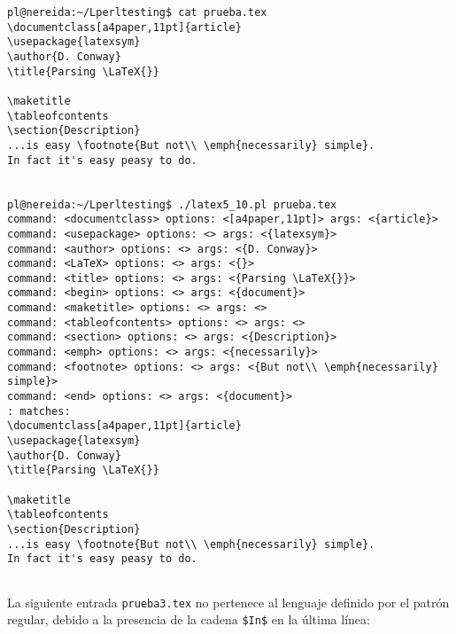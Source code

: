 \begin{verbatim}
pl@nereida:~/Lperltesting$ cat prueba.tex
\documentclass[a4paper,11pt]{article}
\usepackage{latexsym}
\author{D. Conway}
\title{Parsing \LaTeX{}}

\maketitle
\tableofcontents
\section{Description}
...is easy \footnote{But not\\ \emph{necessarily} simple}.
In fact it's easy peasy to do.


pl@nereida:~/Lperltesting$ ./latex5_10.pl prueba.tex
command: <documentclass> options: <[a4paper,11pt]> args: <{article}>
command: <usepackage> options: <> args: <{latexsym}>
command: <author> options: <> args: <{D. Conway}>
command: <LaTeX> options: <> args: <{}>
command: <title> options: <> args: <{Parsing \LaTeX{}}>
command: <begin> options: <> args: <{document}>
command: <maketitle> options: <> args: <>
command: <tableofcontents> options: <> args: <>
command: <section> options: <> args: <{Description}>
command: <emph> options: <> args: <{necessarily}>
command: <footnote> options: <> args: <{But not\\ \emph{necessarily} simple}>
command: <end> options: <> args: <{document}>
: matches:
\documentclass[a4paper,11pt]{article}
\usepackage{latexsym}
\author{D. Conway}
\title{Parsing \LaTeX{}}

\maketitle
\tableofcontents
\section{Description}
...is easy \footnote{But not\\ \emph{necessarily} simple}.
In fact it's easy peasy to do.


\end{verbatim}
La siguiente entrada \verb|prueba3.tex| no pertenece
al lenguaje definido por el patrón regular,
debido a la presencia de la cadena \verb|$In$|
en la última línea:
